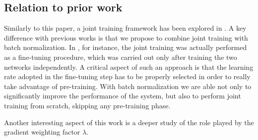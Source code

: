 \documentclass{article}
\begin{document}


\subsection{Relation to prior work}
Similarly to this paper, a joint training framework has been explored in \cite{joint2,joint1,joint3,joint6,joint7,joint4,joint5}. A key difference with previous works is that we propose to combine joint training with batch normalization. %
In \cite{joint1,joint3}, for instance, the joint training was actually performed as a fine-tuning procedure, which was carried out only after training the two networks independently. A critical aspect of such an approach is that the learning rate adopted in the fine-tuning step has to be properly selected in order to really take advantage of pre-training. With batch normalization we are able not only to significantly improve the performance of the system, but also to perform joint training from scratch, skipping any pre-training phase. 

Another interesting aspect of this work is a deeper study of the role played by the gradient weighting factor $\lambda$.%

\end{document}
